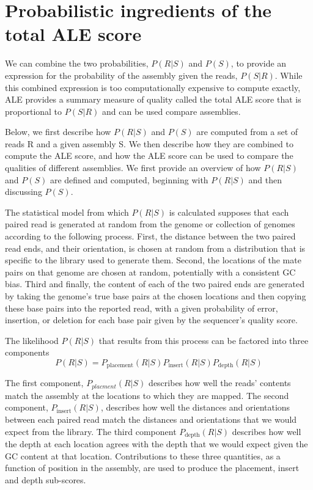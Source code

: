 \documentclass[phd,tocprelim]{cornell}
\begin{document}

\section{Probabilistic ingredients of the total ALE score} %
\label{sec:Probabilistic ingredients of the total ALE score}

We can combine the two probabilities, $P(R|S)$ and $P(S)$, to provide an expression for the probability of the assembly given the reads, $P(S|R)$.  While this combined expression is too computationally expensive to compute exactly, ALE provides a summary measure of quality called the total ALE score that is proportional to $P(S|R)$ and can be used compare assemblies.

Below, we first describe how $P(R|S)$ and $P(S)$ are computed from a set of reads R and a given assembly S.  We then describe how they are combined to compute the ALE score, and how the ALE score can be used to compare the qualities of different assemblies. We first provide an overview of how $P(R|S)$ and $P(S)$ are defined and computed, beginning with $P(R|S)$ and then discussing $P(S)$.

The statistical model from which $P(R|S)$ is calculated supposes that each paired read is generated at random from the genome or collection of genomes according to the following process.  First, the distance between the two paired read ends, and their orientation, is chosen at random from a distribution that is specific to the library used to generate them.  Second, the locations of the mate pairs on that genome are chosen at random, potentially with a consistent GC bias.  Third and finally, the content of each of the two paired ends are generated by taking the genome’s true base pairs at the chosen locations and then copying these base pairs into the reported read, with a given probability of error, insertion, or deletion for each base pair given by the sequencer’s quality score.

The likelihood $P(R|S)$ that results from this process can be factored into three components
\begin{equation}
    P(R|S)=P_{\text{placement}}(R|S)P_{\text{insert}}(R|S)P_{\text{depth}}(R|S)
\end{equation}

The first component, $P_{placment}(R|S)$ describes how well the reads’ contents match the assembly at the locations to which they are mapped. The second component, $P_{\text{insert}}(R|S)$, describes how well the distances and orientations between each paired read match the distances and orientations that we would expect from the library.  The third component $P_{\text{depth}}(R|S)$ describes how well the depth at each location agrees with the depth that we would expect given the GC content at that location. Contributions to these three quantities, as a function of position in the assembly, are used to produce the placement, insert and depth sub-scores.
\end{document}
